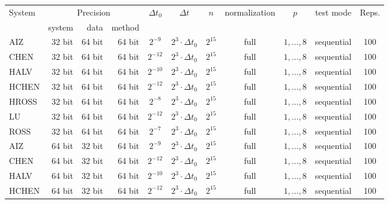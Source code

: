 \documentclass{article}
\newcommand{\stepsize}{\Delta\!t}
\begin{document}
\begin{table}[b!]
    \begin{center}
        \fontsize{8.0pt}{10pt}\selectfont
        \selectfont
        \renewcommand{\arraystretch}{1.05}
        \setlength{\tabcolsep}{0.5em}
        \begin{tabular}{lrrrccccccc}
            \toprule
            System & \multicolumn{3}{c}{Precision} & $\stepsize_0$ & $\stepsize$ & $n$ & normalization & $p$ & test mode & Reps.\\
            \cmidrule(lr){2-4}
            & system & data & method & & & & & & & \\
            \midrule
            AIZ & 32 bit & 64 bit & 64 bit & $2^{-9}$ & $2^3 \cdot \stepsize_0$ & $2^{15}$ & full & $1, \dots, 8$ & sequential & 100\\
            CHEN & 32 bit & 64 bit & 64 bit & $2^{-12}$ & $2^3 \cdot \stepsize_0$ & $2^{15}$ & full & $1, \dots, 8$ & sequential & 100\\
            HALV & 32 bit & 64 bit & 64 bit & $2^{-10}$ & $2^3 \cdot \stepsize_0$ & $2^{15}$ & full & $1, \dots, 8$ & sequential & 100\\
            HCHEN & 32 bit & 64 bit & 64 bit & $2^{-12}$ & $2^3 \cdot \stepsize_0$ & $2^{15}$ & full & $1, \dots, 8$ & sequential & 100\\
            HROSS & 32 bit & 64 bit & 64 bit & $2^{-8}$ & $2^3 \cdot \stepsize_0$ & $2^{15}$ & full & $1, \dots, 8$ & sequential & 100\\
            LU & 32 bit & 64 bit & 64 bit & $2^{-12}$ & $2^3 \cdot \stepsize_0$ & $2^{15}$ & full & $1, \dots, 8$ & sequential & 100\\
            ROSS & 32 bit & 64 bit & 64 bit & $2^{-7}$ & $2^3 \cdot \stepsize_0$ & $2^{15}$ & full & $1, \dots, 8$ & sequential & 100\\
            AIZ & 64 bit & 32 bit & 64 bit & $2^{-9}$ & $2^3 \cdot \stepsize_0$ & $2^{15}$ & full & $1, \dots, 8$ & sequential & 100\\
            CHEN & 64 bit & 32 bit & 64 bit & $2^{-12}$ & $2^3 \cdot \stepsize_0$ & $2^{15}$ & full & $1, \dots, 8$ & sequential & 100\\
            HALV & 64 bit & 32 bit & 64 bit & $2^{-10}$ & $2^3 \cdot \stepsize_0$ & $2^{15}$ & full & $1, \dots, 8$ & sequential & 100\\
            HCHEN & 64 bit & 32 bit & 64 bit & $2^{-12}$ & $2^3 \cdot \stepsize_0$ & $2^{15}$ & full & $1, \dots, 8$ & sequential & 100\\

\end{tabular}
\end{center}
\end{table}
\end{document}

